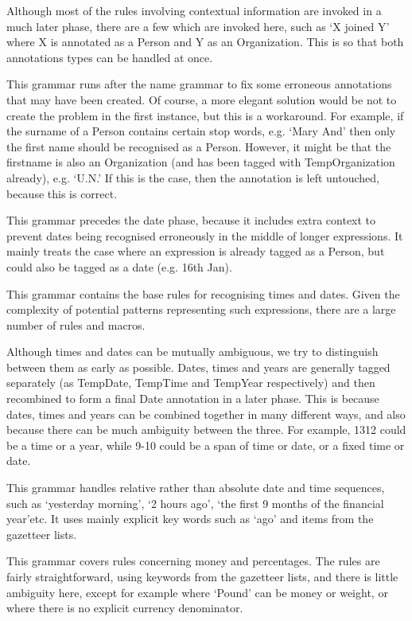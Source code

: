 Although most of the rules involving contextual information are
invoked in a much later phase, there are a few which are invoked here,
such as `X joined Y' where X is annotated as a Person and Y as an
Organization. This is so that both annotations types can be handled at once.

This grammar runs after the name grammar to fix some erroneous
annotations that may have been created. Of course, a more elegant
solution would be not to create the problem in the first instance, but
this is a workaround. For example, if the surname of a Person contains
certain stop words, e.g. `Mary And' then only the first name should be
recognised as a Person. However, it might be that the firstname is
also an Organization (and has been tagged with TempOrganization
already), e.g. `U.N.' If this is the case, then the annotation is left
untouched, because this is correct.

This grammar precedes the date phase, because it includes extra context
to prevent dates being recognised erroneously in the middle of longer
expressions. It mainly treats the case where an expression is already
tagged as a Person, but could also be tagged as a date (e.g. 16th
Jan).

This grammar contains the base rules for recognising times and
dates. Given the complexity of potential patterns representing such
expressions, there are a large number of rules and macros.

Although times and dates can be mutually ambiguous, we try to
distinguish between them as early as possible. Dates, times and years
are generally tagged separately (as TempDate, TempTime and TempYear
respectively) and then recombined to form a final Date annotation in a
later phase. This is because dates, times and years can be combined
together in many different ways, and also because there can be much
ambiguity between the three. For example, 1312 could be a time or a
year, while 9-10 could be a span of time or date, or a fixed time
or date.

This grammar handles relative rather than absolute date and time
sequences, such as `yesterday morning', `2 hours ago', `the first
9 months of the financial year'etc. It uses mainly explicit key words
such as `ago' and items from the gazetteer lists.



This grammar covers rules concerning money and percentages.
The rules are fairly straightforward, using keywords from the
gazetteer lists, and there is little ambiguity here, except for
example where `Pound' can be money or weight, or where there is no
explicit currency denominator.

